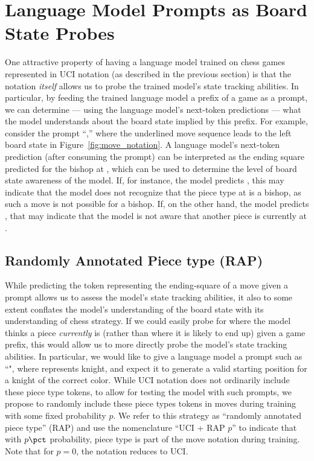 \section{Language Model Prompts as Board State Probes}
\label{sec:probing}
One attractive property of having a language model trained on chess games represented in UCI notation (as described in the previous section) is that the notation \textit{itself} allows us to probe the trained model's state tracking abilities. In particular, by feeding the trained language model a prefix of a game as a prompt, we can determine --- using the language model's next-token predictions --- what the model understands about the board state implied by this prefix.
For example, consider the prompt ``,''  where the underlined move sequence leads to the left board state in Figure~\ref{fig:move_notation}. A language model's next-token prediction (after consuming the prompt) can be interpreted as the ending square predicted %
for the bishop at , which can be used to determine the level of board state awareness of the model. %
If, for instance, the model predicts , this may indicate that the model does not recognize that the piece type at  is a bishop, as such a move is not possible for a bishop.
If, on the other hand, the model predicts , that may indicate that the model is not aware that another piece is currently  at .

\subsection{Randomly Annotated Piece type (RAP)}
\label{sec:rap_board}
While predicting the token representing the ending-square of a move given a prompt allows us to assess the model's state tracking abilities, it also to some extent conflates the model's understanding of the board state with its understanding of chess strategy. If we could easily probe for where the model thinks a piece \textit{currently} is (rather than where it is likely to end up) given a game prefix, this would allow us to more directly probe the model's state tracking abilities. 
In particular, we would like to give a language model a prompt such as ``", where  represents knight, and expect it to generate a valid starting position for a knight of the correct color. 
While UCI notation does not ordinarily include these piece type tokens, to allow for testing the model with such prompts, 
we propose to randomly include these piece types tokens in moves during training with some fixed probability $p$.
We refer to this strategy as ``randomly annotated piece type'' (RAP) and 
use the nomenclature ``UCI + RAP $p$'' to indicate that with $p\pct$ probability, piece type is part of the move notation during training.
Note that for $p = 0$, the notation reduces to UCI. 

